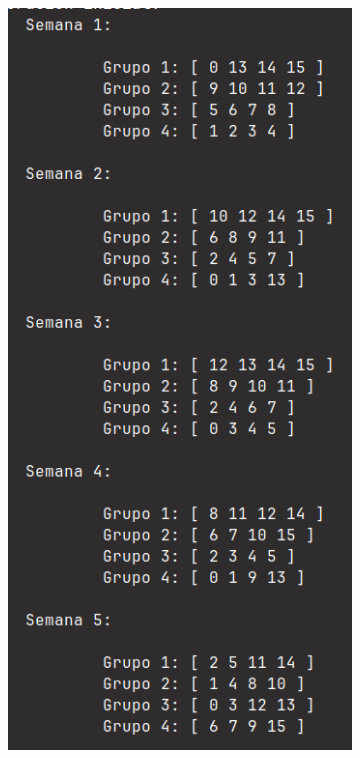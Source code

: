 \documentclass[letter, 10pt]{article}
\begin{document}
\begin{figure}[h]
    \centering
    \begin{subfigure}[b]{0.3\textwidth}
        \centering
        \includegraphics[width=\textwidth]{figures/greedy_freedom.png}

\end{subfigure}
\end{figure}
\end{document}

